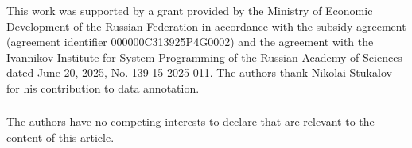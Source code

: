 \documentclass[runningheads,a4paper]{llncs}
\begin{document}
\FloatBarrier
\begin{credits}
\subsubsection{\ackname}
This work was supported by a grant provided by the Ministry of Economic
Development of the Russian Federation in accordance with the subsidy agreement
(agreement identifier 000000C313925P4G0002) and the agreement with the Ivannikov
Institute for System Programming of the Russian Academy of Sciences dated
June 20, 2025, No. 139-15-2025-011. The authors thank Nikolai Stukalov for his
contribution to data annotation.

\subsubsection{\discintname}
The authors have no competing interests to declare that are relevant to the
content of this article.
\end{credits}



\end{document}
